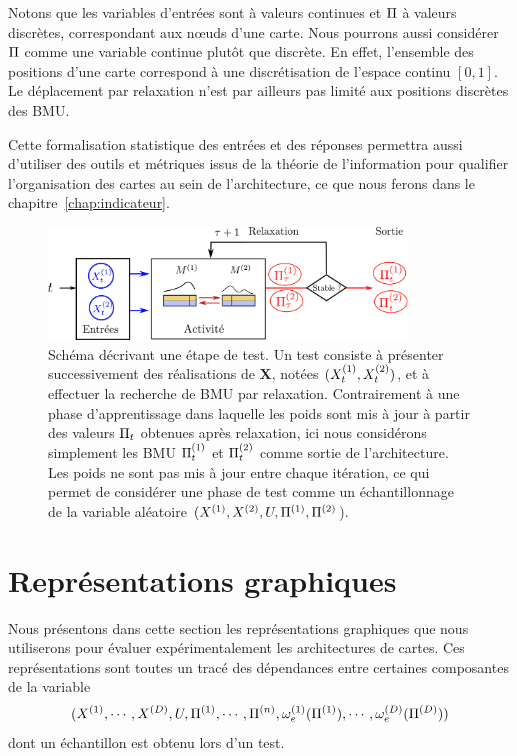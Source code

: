 \documentclass[../main]{subfiles}
\begin{document}
Notons que les variables d'entrées sont à valeurs continues et $\Pi$ à valeurs discrètes, correspondant aux n\oe{}uds d'une carte.
Nous pourrons aussi considérer $\Pi$ comme une variable continue plutôt que discrète.
En effet, l'ensemble des positions d'une carte correspond à une discrétisation de l'espace continu $[0,1]$. Le déplacement par relaxation n'est par ailleurs pas limité aux positions discrètes des BMU.


Cette formalisation statistique des entrées et des réponses permettra aussi d'utiliser des outils et métriques issus de la théorie de l'information pour qualifier l'organisation des cartes au sein de l'architecture, ce que nous ferons dans le chapitre~\ref{chap:indicateur}.

\begin{figure}
\centering
\includegraphics[width=0.85\textwidth]{tests_2maps.pdf}
\caption{Schéma décrivant une étape de test. Un test consiste à présenter successivement des réalisations de $\mathbf{X}$, notées $(X^{({1})}_t,X^{({2})}_t)$, et à effectuer la recherche de BMU par relaxation.
Contrairement à une phase d'apprentissage dans laquelle les poids sont mis à jour à partir des valeurs $\Pi_t$ obtenues après relaxation, ici nous considérons simplement les BMU $\Pi_t^{({1})}$ et  $\Pi_t^{({2})}$ comme sortie de l'architecture.
Les poids ne sont pas mis à jour entre chaque itération, ce qui permet de considérer une phase de test comme un échantillonnage de la variable aléatoire $(X^{({1})},X^{({2})}, U, \Pi^{({1})}, \Pi^{({2})}$).\label{fig:flowchart} }

\end{figure}

\section{Représentations graphiques}

Nous présentons dans cette section les représentations graphiques que nous utiliserons pour évaluer expérimentalement les architectures de cartes.
Ces représentations sont toutes un tracé des dépendances entre certaines composantes de la variable $$(X^{({1})}, \cdots, X^{({D})}, U, \Pi^{({1})}, \cdots, \Pi^{({n})}, \omega_e^{({1})}(\Pi^{({1})}), \cdots, \omega_e^{({D})}(\Pi^{({D})}))$$ dont un échantillon est obtenu lors d'un test.
\end{document}

